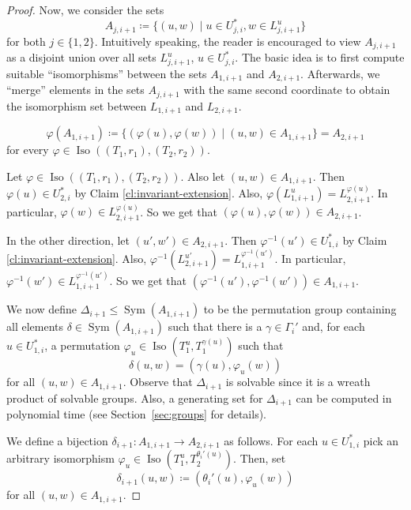 \documentclass{theoretics}
\DeclareMathOperator{\Iso}{Iso}
\DeclareMathOperator{\Sym}{Sym}
\begin{document}
\begin{proof}
 Now, we consider the sets
 \[A_{j,i+1} \coloneqq \{(u,w) \mid u \in U_{j,i}^*, w \in L_{j,i+1}^{u}\}\]
 for both $j \in \{1,2\}$.
 Intuitively speaking, the reader is encouraged to view $A_{j,i+1}$ as a disjoint union over all sets $L_{j,i+1}^{u}$, $u \in U_{j,i}^*$.
 The basic idea is to first compute suitable ``isomorphisms'' between the sets $A_{1,i+1}$ and $A_{2,i+1}$.
 Afterwards, we ``merge'' elements in the sets $A_{j,i+1}$ with the same second coordinate to obtain the isomorphism set between $L_{1,i+1}$ and $L_{2,i+1}$.

 \begin{claim}
  \[\varphi(A_{1,i+1}) \coloneqq \{(\varphi(u),\varphi(w)) \mid (u,w) \in A_{1,i+1}\} = A_{2,i+1}\]
  for every $\varphi \in \Iso((T_1,r_1),(T_2,r_2))$.
 \end{claim}

 \begin{subproof}
  Let $\varphi \in \Iso((T_1,r_1),(T_2,r_2))$.
  Also let $(u,w) \in A_{1,i+1}$.
  Then $\varphi(u) \in U_{2,i}^*$ by Claim \ref{cl:invariant-extension}.
  Also, $\varphi(L_{1,i+1}^u) = L_{2,i+1}^{\varphi(u)}$.
  In particular, $\varphi(w) \in L_{2,i+1}^{\varphi(u)}$.
  So we get that $(\varphi(u),\varphi(w)) \in A_{2,i+1}$.

  In the other direction, let $(u',w') \in A_{2,i+1}$.
  Then $\varphi^{-1}(u') \in U_{1,i}^*$ by Claim \ref{cl:invariant-extension}.
  Also, $\varphi^{-1}(L_{2,i+1}^{u'}) = L_{1,i+1}^{\varphi^{-1}(u')}$.
  In particular, $\varphi^{-1}(w') \in L_{1,i+1}^{\varphi^{-1}(u')}$.
  So we get that $(\varphi^{-1}(u'),\varphi^{-1}(w')) \in A_{1,i+1}$.
 \end{subproof}

 We now define $\Delta_{i+1} \leq \Sym(A_{1,i+1})$ to be the permutation group containing all elements $\delta \in \Sym(A_{1,i+1})$ such that there is a $\gamma \in \Gamma_i'$ and, for each $u \in U_{1,i}^*$, a permutation $\varphi_u \in \Iso(T_1^u,T_1^{\gamma(u)})$ such that
 \[\delta(u,w) = (\gamma(u),\varphi_u(w))\]
 for all $(u,w) \in A_{1,i+1}$.
 Observe that $\Delta_{i+1}$ is solvable since it is a wreath product of solvable groups.
 Also, a generating set for $\Delta_{i+1}$ can be computed in polynomial time (see Section~\ref{sec:groups} for details).

 We define a bijection $\delta_{i+1}\colon A_{1,i+1} \to A_{2,i+1}$ as follows.
 For each $u \in U_{1,i}^*$ pick an arbitrary isomorphism $\varphi_u \in \Iso(T_1^u,T_2^{\theta_i'(u)})$.
 Then, set
 \[\delta_{i+1}(u,w) \coloneqq (\theta_i'(u),\varphi_u(w))\]
 for all $(u,w) \in A_{1,i+1}$.


\end{proof}
\end{document}
